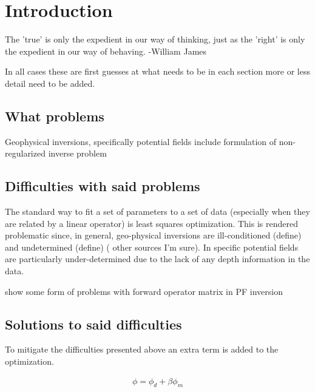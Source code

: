 
\chapter{Introduction}
\label{ch:Introduction}

\begin{epigraph}
The 'true' is only the expedient in our way of thinking, just as the 'right' is only the expedient in our way of behaving.
-William James
\end{epigraph}


In all cases these are first guesses at what needs to be in each section more or less detail need to be added.


\section{What problems}
\label{sec:What problems}

Geophysical inversions, specifically potential fields 
include formulation of non-regularized inverse problem

\section{Difficulties with said problems }
\label{sec:Difficulties with said problems }

The standard way to fit a set of parameters to a set of data (especially when they are related by a linear operator) is least squares optimization. This is rendered problematic since, in general, geo-physical inversions are ill-conditioned (define) and undetermined (define) (\cite{oldenburg2005inversion} other sources I'm sure). In specific potential fields are particularly under-determined due to the lack of any depth information in the data.

show some form of problems with forward operator matrix in PF inversion

\section{Solutions to said difficulties}
\label{sec:Solutions to said difficulties}

To mitigate the difficulties presented above an extra term is added to the optimization. 

\begin{align}
\phi = \phi_d + \beta\phi_m
\end{align}
\label{eq:objective function}

